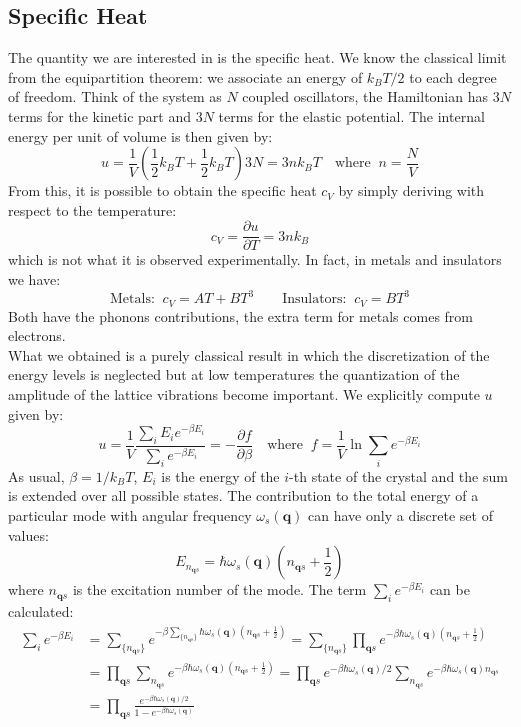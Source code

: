 \documentclass[10.75pt,a4paper,openright,bottom=2cm]{article}
\renewcommand{\Vec}[1]{\boldsymbol{#1}}
\begin{document}
\subsection{Specific Heat}
The quantity we are interested in is the specific heat. We know the classical limit from the equipartition theorem: we associate an energy of $k_BT/2$ to each degree of freedom. Think of the system as $N$ coupled oscillators, the Hamiltonian has $3N$ terms for the kinetic part and $3N$ terms for the elastic potential. The internal energy per unit of volume is then given by:
\[
u=\frac{1}{V}\left(\frac{1}{2}k_BT+\frac{1}{2}k_BT\right)3N=3nk_BT \quad \text{where}\;\;n=\frac{N}{V}
\]
From this, it is possible to obtain the specific heat $c_V$ by simply deriving with respect to the temperature:
\[
c_V=\frac{\partial u}{\partial T}=3nk_B
\]
which is not what it is observed experimentally. In fact, in metals and insulators we have:
\[
\text{Metals:}\;\;c_V=AT+BT^3 \qquad \text{Insulators:}\;\;c_V=BT^3
\]
Both have the phonons contributions, the extra term for metals comes from electrons.\\
What we obtained is a purely classical result in which the discretization of the energy levels is neglected but at low temperatures the quantization of the amplitude of the lattice vibrations become important. We explicitly compute $u$ given by:
\[
u=\frac{1}{V}\frac{\sum_iE_ie^{-\beta E_i}}{\sum_ie^{-\beta E_i}}=-\frac{\partial f}{\partial\beta} \quad \text{where}\;\;f=\frac{1}{V}\ln{\sum_ie^{-\beta E_i}}
\]
As usual, $\beta=1/k_BT$, $E_i$ is the energy of the $i$-th state of the crystal and the sum is extended over all possible states. The contribution to the total energy of a particular mode with angular frequency $\omega_s(\Vec{q})$ can have only a discrete set of values:
\[
E_{n_{\Vec{q}s}}=\hbar\omega_s(\Vec{q})\left(n_{\Vec{q}s}+\frac{1}{2}\right)
\]
where $n_{\Vec{q}s}$ is the excitation number of the mode. The term $\sum_ie^{-\beta E_i}$ can be calculated:
\begin{align*}
\sum_ie^{-\beta E_i}&=\sum_{\{n_{\Vec{q}s}\}}e^{-\beta\sum_{\{n_{\Vec{q}s}\}}\hbar\omega_s(\Vec{q})\left(n_{\Vec{q}s}+\frac{1}{2}\right)}=\sum_{\{n_{\Vec{q}s}\}}\prod_{\Vec{q}s}e^{-\beta\hbar\omega_s(\Vec{q})\left(n_{\Vec{q}s}+\frac{1}{2}\right)}\\
&=\prod_{\Vec{q}s}\sum_{n_{\Vec{q}s}}e^{-\beta\hbar\omega_s(\Vec{q})\left(n_{\Vec{q}s}+\frac{1}{2}\right)}=\prod_{\Vec{q}s}e^{-\beta\hbar\omega_s(\Vec{q})/2}\sum_{n_{\Vec{q}s}}e^{-\beta\hbar\omega_s(\Vec{q})n_{\Vec{q}s}}\\
&=\prod_{\Vec{q}s}\frac{e^{-\beta\hbar\omega_s(\Vec{q})/2}}{1-e^{-\beta\hbar\omega_s(\Vec{q})}}
\end{align*}
\end{document}

